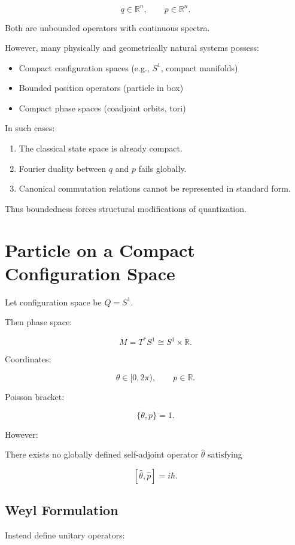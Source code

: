 \documentclass[11pt]{book}
\begin{document}
\[
q \in \mathbb{R}^n,
\qquad
p \in \mathbb{R}^n.
\]

Both are unbounded operators with continuous spectra.

However, many physically and geometrically natural systems possess:

\begin{itemize}
\item Compact configuration spaces (e.g., $S^1$, compact manifolds)
\item Bounded position operators (particle in box)
\item Compact phase spaces (coadjoint orbits, tori)
\end{itemize}

In such cases:

\begin{enumerate}
\item The classical state space is already compact.
\item Fourier duality between $q$ and $p$ fails globally.
\item Canonical commutation relations cannot be represented in standard form.
\end{enumerate}

Thus boundedness forces structural modifications of quantization.

\section{Particle on a Compact Configuration Space}

Let configuration space be $Q = S^1$.

Then phase space:

\[
M = T^*S^1 \cong S^1 \times \mathbb{R}.
\]

Coordinates:

\[
\theta \in [0,2\pi),
\qquad
p \in \mathbb{R}.
\]

Poisson bracket:

\[
\{\theta,p\}=1.
\]

However:

There exists no globally defined self-adjoint operator $\hat{\theta}$ satisfying

\[
[\hat{\theta},\hat{p}] = i\hbar.
\]

\subsection{Weyl Formulation}

Instead define unitary operators:
\end{document}
